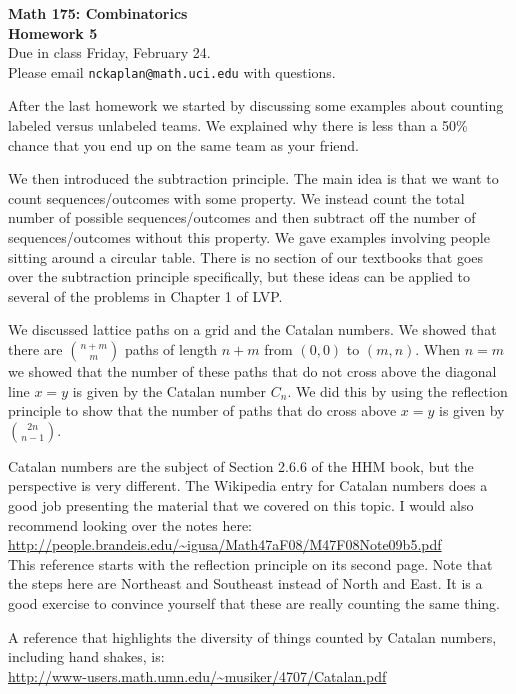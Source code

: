 \documentclass[11pt]{article}
\begin{document}
\begin{center}
{\Large \bf Math 175: Combinatorics} \\
{\Large \bf Homework 5}\\
{\Large Due in class Friday, February 24. \\
Please email \texttt{nckaplan@math.uci.edu} with questions.}
\end{center}

\vspace{5mm}

After the last homework we started by discussing some examples about counting labeled versus unlabeled teams.  We explained why there is less than a 50\% chance that you end up on the same team as your friend.

We then introduced the subtraction principle.  The main idea is that we want to count sequences/outcomes with some property.  We instead count the total number of possible sequences/outcomes and then subtract off the number of sequences/outcomes without this property.  We gave examples involving people sitting around a circular table.  There is no section of our textbooks that goes over the subtraction principle specifically, but these ideas can be applied to several of the problems in Chapter 1 of LVP.

We discussed lattice paths on a grid and the Catalan numbers.  We showed that there are $\binom{n+m}{m}$ paths of length $n+m$ from $(0,0)$ to $(m,n)$.  When $n=m$ we showed that the number of these paths that do not cross above the diagonal line $x=y$ is given by the Catalan number $C_n$.  We did this by using the reflection principle to show that the number of paths that do cross above $x=y$ is given by $\binom{2n}{n-1}$.  

Catalan numbers are the subject of Section 2.6.6 of the HHM book, but the perspective is very different.  The Wikipedia entry for Catalan numbers does a good job presenting the material that we covered on this topic.  I would also recommend looking over the notes here:\\
\url{http://people.brandeis.edu/~igusa/Math47aF08/M47F08Note09b5.pdf}\\
This reference starts with the reflection principle on its second page.  Note that the steps here are Northeast and Southeast instead of North and East.  It is a good exercise to convince yourself that these are really counting the same thing. 

A reference that highlights the diversity of things counted by Catalan numbers, including hand shakes, is:\\
\url{http://www-users.math.umn.edu/~musiker/4707/Catalan.pdf}
\end{document}
